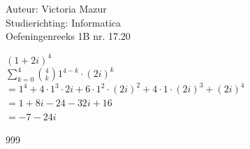 \documentclass[a4paper]{article}
\begin{document}
  
\noindent \large Auteur: Victoria Mazur \\
\noindent \large Studierichting: Informatica\\
\noindent \large Oefeningenreeks 1B nr. 17.20\\

\medskip

\normalsize

$ (1 + 2i)^4 $ \\

$\displaystyle\sum\limits_{k=0}^{4} \binom{4}{k} 1^{4-k} \cdot (2i)^k$ \\

$= 1^4 + 4 \cdot 1^3 \cdot 2i + 6 \cdot 1^2 \cdot (2i)^2 + 4 \cdot 1 \cdot (2i)^3 + (2i)^4$ \\

$= 1 + 8i - 24 - 32i + 16$\\

$= -7 - 24i$

\begin{thebibliography}{999}
\end{thebibliography}
\end{document}
